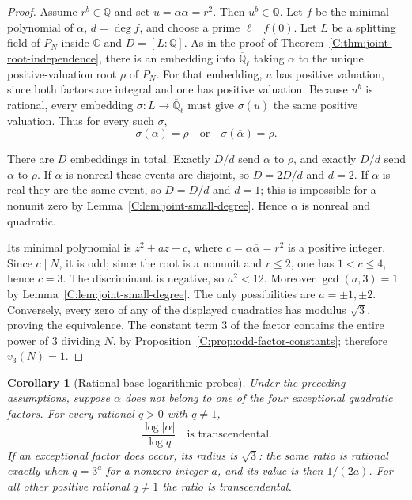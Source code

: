 \documentclass[11pt,a4paper]{article}
\newtheorem{corollary}[theorem]{Corollary}
\theoremstyle{definition}
\theoremstyle{remark}
\numberwithin{equation}{section}
\begin{document}
\begin{proof}
Assume $r^b\in\mathbb Q$ and set
$u=\alpha\overline\alpha=r^2$.
Then $u^b\in\mathbb Q$.
Let $f$ be the minimal polynomial of $\alpha$,
$d=\deg f$, and choose a prime $\ell\mid f(0)$.
Let $L$ be a splitting field of $P_N$ inside $\mathbb C$ and
$D=[L:\mathbb Q]$.
As in the proof of Theorem~\ref{C:thm:joint-root-independence}, there
is an embedding into $\overline{\mathbb Q}_\ell$ taking $\alpha$
to the unique positive-valuation root $\rho$ of $P_N$.
For that embedding, $u$ has positive valuation, since both
factors are integral and one has positive valuation.
Because $u^b$ is rational, every embedding
$\sigma:L\longrightarrow\overline{\mathbb Q}_\ell$ must give
$\sigma(u)$ the same positive valuation.
Thus for every such $\sigma$,
\[
 \sigma(\alpha)=\rho
 \quad\text{or}\quad
 \sigma(\overline\alpha)=\rho.
\]

There are $D$ embeddings in total.
Exactly $D/d$ send $\alpha$ to $\rho$, and exactly $D/d$ send
$\overline\alpha$ to $\rho$.
If $\alpha$ is nonreal these events are disjoint, so $D=2D/d$
and $d=2$.
If $\alpha$ is real they are the same event, so $D=D/d$ and
$d=1$; this is impossible for a nonunit zero by
Lemma~\ref{C:lem:joint-small-degree}.
Hence $\alpha$ is nonreal and quadratic.

Its minimal polynomial is $z^2+az+c$, where
$c=\alpha\overline\alpha=r^2$ is a positive integer.
Since $c\mid N$, it is odd; since the root is a nonunit and
$r\le2$, one has $1<c\le4$, hence $c=3$.
The discriminant is negative, so $a^2<12$.
Moreover $\gcd(a,3)=1$ by Lemma~\ref{C:lem:joint-small-degree}.
The only possibilities are $a=\pm1,\pm2$.
Conversely, every zero of any of the displayed quadratics has
modulus $\sqrt3$, proving the equivalence.
The constant term $3$ of the factor contains the entire power of
$3$ dividing $N$, by Proposition~\ref{C:prop:odd-factor-constants};
therefore $v_3(N)=1$.
\end{proof}

\begin{corollary}[Rational-base logarithmic probes]
\label{C:cor:joint-rational-base}
Under the preceding assumptions, suppose $\alpha$ does not belong
to one of the four exceptional quadratic factors.
For every rational $q>0$ with $q\ne1$,
\[
 \frac{\log|\alpha|}{\log q}
 \quad\text{is transcendental}.
\]
If an exceptional factor does occur, its radius is $\sqrt3$:
the same ratio is rational exactly when $q=3^a$ for a nonzero
integer $a$, and its value is then $1/(2a)$.
For all other positive rational $q\ne1$ the ratio is transcendental.
\end{corollary}
\end{document}
